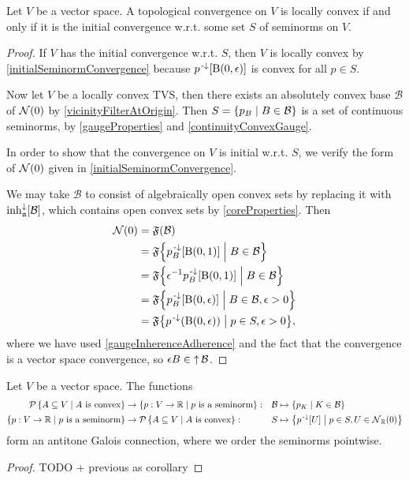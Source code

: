 \begin{proposition} \label{locallyConvexSeminormTopology}
Let $V$ be a vector space. A topological convergence on $V$ is locally convex \textup{if and only if} it is the initial convergence w.r.t. some set $S$ of seminorms on $V$.
\end{proposition}
\begin{proof}
If $V$ has the initial convergence w.r.t. $S$, then $V$ is locally convex by \ref{initialSeminormConvergence} because $p^{\text{\hspace{0.15em}-}\downarrow}[\operatorname{B}(0,\epsilon)]$ is convex for all $p\in S$.

Now let $V$ be a locally convex TVS, then there exists an absolutely convex base $\mathcal{B}$ of $\operatorname{\mathcal{N}}(0)$ by \ref{vicinityFilterAtOrigin}. Then $S = \setbuilder{p_B}{B\in \mathcal{B}}$ is a set of continuous seminorms, by \ref{gaugeProperties} and \ref{continuityConvexGauge}.

In order to show that the convergence on $V$ is initial w.r.t. $S$, we verify the form of $\operatorname{\mathcal{N}}(0)$ given in \ref{initialSeminormConvergence}.

We may take $\mathcal{B}$ to consist of algebraically open convex sets by replacing it with $\operatorname{inh}_\mathfrak{a}^\downarrow[\mathcal{B}]$, which contains open convex sets by \ref{coreProperties}. Then
\begin{align*}
\neighbourhood(0) &= \mathfrak{F}(\mathcal{B}) \\
&= \mathfrak{F}\setbuilder{p_B^\preimf[\ball(0,1)]}{B\in \mathcal{B}} \\
&= \mathfrak{F}\setbuilder{\epsilon^{-1} p_B^\preimf[\ball(0,1)]}{B\in \mathcal{B}} \\
&= \mathfrak{F}\setbuilder{p_B^\preimf[\ball(0,\epsilon)]}{B\in \mathcal{B}, \epsilon > 0} \\
&= \mathfrak{F}\setbuilder{p^\preimf(\ball(0,\epsilon))}{p\in S, \epsilon > 0},
\end{align*}
where we have used \ref{gaugeInherenceAdherence} and the fact that the convergence is a vector space convergence, so $\epsilon B \in \operatorname{\uparrow}\mathcal{B}$.
\end{proof}

\begin{proposition}
Let $V$ be a vector space. The functions
\begin{align*}
\powerset\setbuilder{A\subseteq V}{\text{$A$ is convex}} &\to \setbuilder{p: V\to \R}{\text{$p$ is a seminorm}}: &&\mathcal{B}\mapsto \setbuilder{p_K}{K\in \mathcal{B}} \\
\setbuilder{p: V\to \R}{\text{$p$ is a seminorm}} &\to \powerset\setbuilder{A\subseteq V}{\text{$A$ is convex}}: &&S\mapsto \setbuilder{p^\preimf[U]}{p\in S, U\in \neighbourhood_\R(0)}
\end{align*}
form an antitone Galois connection, where we order the seminorms pointwise.
\end{proposition}
\begin{proof}
TODO + previous as corollary
\end{proof}

